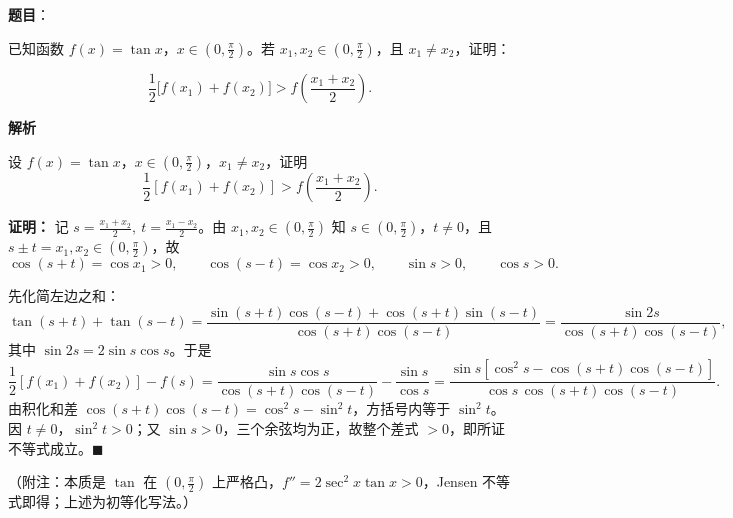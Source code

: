 \begin{answer}

\textbf{题目}：

已知函数 $f(x)=\tan x$，$x\in\left(0,\frac\pi2\right)$。若 $x_1,x_2\in\left(0,\frac\pi2\right)$，且 $x_1\ne x_2$，证明：

\nopagebreak[4]
\[
\frac12\bigl[f(x_1)+f(x_2)\bigr]>f\left(\frac{x_1+x_2}{2}\right).
\]

\textbf{解析}

设 $f(x)=\tan x$，$x\in\left(0,\frac\pi2\right)$，$x_1\ne x_2$，证明
\nopagebreak[4]
\[\frac12\left[f(x_1)+f(x_2)\right]>f\left(\frac{x_1+x_2}{2}\right).\]

\textbf{证明：} 记 $s=\frac{x_1+x_2}2,\ t=\frac{x_1-x_2}2$。由 $x_1,x_2\in\left(0,\frac\pi2\right)$ 知 $s\in\left(0,\frac\pi2\right)$，$t\ne0$，且 $s\pm t=x_{1},x_{2}\in\left(0,\frac\pi2\right)$，故
\nopagebreak[4]
\[\cos(s+t)=\cos x_1>0,\qquad \cos(s-t)=\cos x_2>0,\qquad \sin s>0,\qquad \cos s>0.\]

先化简左边之和：
\nopagebreak[4]
\[\tan(s+t)+\tan(s-t)=\frac{\sin(s+t)\cos(s-t)+\cos(s+t)\sin(s-t)}{\cos(s+t)\cos(s-t)}=\frac{\sin 2s}{\cos(s+t)\cos(s-t)},\]
其中 $\sin2s=2\sin s\cos s$。于是
\nopagebreak[4]
\[
\frac12\left[f(x_1)+f(x_2)\right]-f(s)
=\frac{\sin s\cos s}{\cos(s+t)\cos(s-t)}-\frac{\sin s}{\cos s}
=\frac{\sin s\left[\cos^2s-\cos(s+t)\cos(s-t)\right]}{\cos s\,\cos(s+t)\cos(s-t)}.
\]
由积化和差 $\cos(s+t)\cos(s-t)=\cos^2s-\sin^2t$，方括号内等于 $\sin^2t$。因 $t\ne0$，$\sin^2t>0$；又 $\sin s>0$，三个余弦均为正，故整个差式 $>0$，即所证不等式成立。$\blacksquare$

（附注：本质是 $\tan$ 在 $\left(0,\frac\pi2\right)$ 上严格凸，$f''=2\sec^2x\tan x>0$，Jensen 不等式即得；上述为初等化写法。）


\end{answer}
